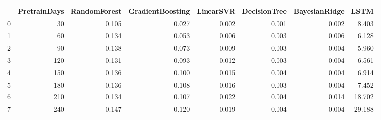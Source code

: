\begin{tabular}{lrrrrrrr}
\toprule
{} &  PretrainDays &  RandomForest &  GradientBoosting &  LinearSVR &  DecisionTree &  BayesianRidge &   LSTM \\
\midrule
0 &            30 &         0.105 &             0.027 &      0.002 &         0.001 &          0.002 &  8.403 \\
1 &            60 &         0.134 &             0.053 &      0.006 &         0.003 &          0.006 &  6.128 \\
2 &            90 &         0.138 &             0.073 &      0.009 &         0.003 &          0.004 &  5.960 \\
3 &           120 &         0.131 &             0.093 &      0.012 &         0.003 &          0.004 &  6.561 \\
4 &           150 &         0.136 &             0.100 &      0.015 &         0.004 &          0.004 &  6.914 \\
5 &           180 &         0.136 &             0.108 &      0.016 &         0.003 &          0.004 &  7.452 \\
6 &           210 &         0.134 &             0.107 &      0.022 &         0.004 &          0.014 & 18.702 \\
7 &           240 &         0.147 &             0.120 &      0.019 &         0.004 &          0.004 & 29.188 \\
\bottomrule
\end{tabular}

